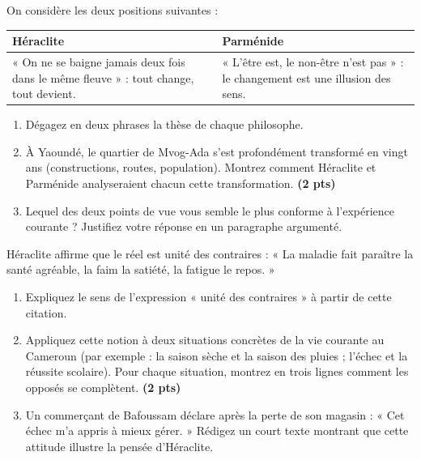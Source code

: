 \documentclass[11pt]{article}
\begin{document}
\begin{exercice}
On considère les deux positions suivantes :
\begin{center}
\begin{tabular}{|p{6.5cm}|p{6.5cm}|}
\hline
\textbf{Héraclite} & \textbf{Parménide} \\
\hline
« On ne se baigne jamais deux fois dans le même fleuve » : tout change, tout devient. & « L'être est, le non-être n'est pas » : le changement est une illusion des sens. \\
\hline
\end{tabular}
\end{center}
\begin{enumerate}
\item Dégagez en deux phrases la thèse de chaque philosophe.
\item À Yaoundé, le quartier de Mvog-Ada s'est profondément transformé en vingt ans (constructions, routes, population). Montrez comment Héraclite et Parménide analyseraient chacun cette transformation. \textbf{(2 pts)}
\item Lequel des deux points de vue vous semble le plus conforme à l'expérience courante ? Justifiez votre réponse en un paragraphe argumenté.
\end{enumerate}
\end{exercice}

\begin{exercice}
Héraclite affirme que le réel est unité des contraires : « La maladie fait paraître la santé agréable, la faim la satiété, la fatigue le repos. »
\begin{enumerate}
\item Expliquez le sens de l'expression « unité des contraires » à partir de cette citation.
\item Appliquez cette notion à deux situations concrètes de la vie courante au Cameroun (par exemple : la saison sèche et la saison des pluies ; l'échec et la réussite scolaire). Pour chaque situation, montrez en trois lignes comment les opposés se complètent. \textbf{(2 pts)}
\item Un commerçant de Bafoussam déclare après la perte de son magasin : « Cet échec m'a appris à mieux gérer. » Rédigez un court texte montrant que cette attitude illustre la pensée d'Héraclite.
\end{enumerate}
\end{exercice}
\end{document}
